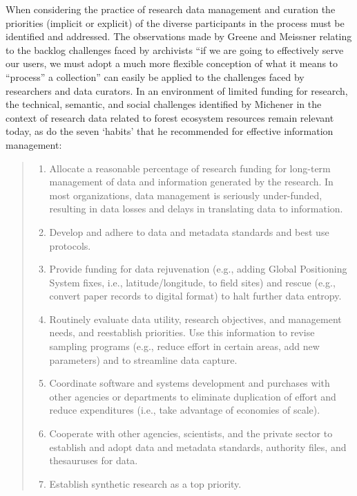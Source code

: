 \documentclass[paper]{ijdc-v9}
\begin{document}
When considering the practice of research data management and curation
the priorities (implicit or explicit) of the diverse participants in the
process must be identified and addressed. The observations made by
Greene and Meissner \autocite*{greene_more_2005} relating to the backlog
challenges faced by archivists ``if we are going to effectively serve
our users, we must adopt a much more ﬂexible conception of what it means
to ``process'' a collection'' \autocite[pp.~233]{greene_more_2005} can
easily be applied to the challenges faced by researchers and data
curators. In an environment of limited funding for research, the
technical, semantic, and social challenges identified by Michener
\autocite*{michener_role_1999} in the context of research data related
to forest ecosystem resources remain relevant today, as do the seven
`habits' that he recommended for effective information management:

\begin{quote}
\begin{enumerate}
\def\labelenumi{\arabic{enumi}.}
\item
  Allocate a reasonable percentage of research funding for long-term
  management of data and information generated by the research. In most
  organizations, data management is seriously under-funded, resulting in
  data losses and delays in translating data to information.
\item
  Develop and adhere to data and metadata standards and best use
  protocols.
\item
  Provide funding for data rejuvenation (e.g., adding Global Positioning
  System fixes, i.e., latitude/longitude, to field sites) and rescue
  (e.g., convert paper records to digital format) to halt further data
  entropy.
\item
  Routinely evaluate data utility, research objectives, and management
  needs, and reestablish priorities. Use this information to revise
  sampling programs (e.g., reduce effort in certain areas, add new
  parameters) and to streamline data capture.
\item
  Coordinate software and systems development and purchases with other
  agencies or departments to eliminate duplication of effort and reduce
  expenditures (i.e., take advantage of economies of scale).
\item
  Cooperate with other agencies, scientists, and the private sector to
  establish and adopt data and metadata standards, authority files, and
  thesauruses for data. \autocite[pp 434]{michener_role_1999}
\item
  Establish synthetic research as a top priority.
\end{enumerate}
\end{quote}
\end{document}
